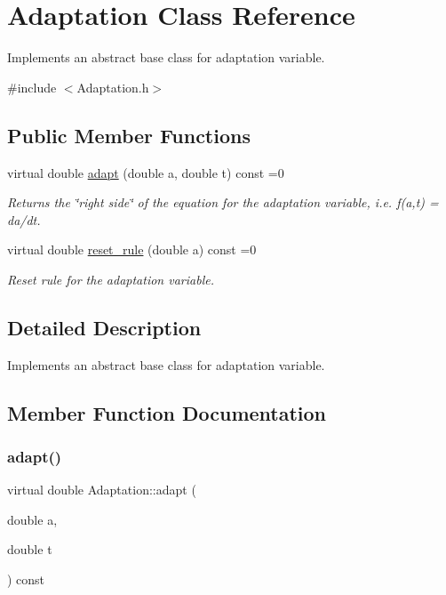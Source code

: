 \hypertarget{classAdaptation}{}\section{Adaptation Class Reference}
\label{classAdaptation}


Implements an abstract base class for adaptation variable.  




{\ttfamily \#include $<$Adaptation.\+h$>$}

\subsection*{Public Member Functions}
\begin{DoxyCompactItemize}
\item 
virtual double \hyperlink{classAdaptation_a4c7f62690bb8639a307c0ed840890e30}{adapt} (double a, double t) const =0
\begin{DoxyCompactList}\small\item\em Returns the \char`\"{}right side\char`\"{} of the equation for the adaptation variable, i.\+e. f(a,t) = da/dt. \end{DoxyCompactList}\item 
virtual double \hyperlink{classAdaptation_a146da63f54c22a3c08c2c5ce26f11f66}{reset\+\_\+rule} (double a) const =0
\begin{DoxyCompactList}\small\item\em Reset rule for the adaptation variable. \end{DoxyCompactList}\end{DoxyCompactItemize}


\subsection{Detailed Description}
Implements an abstract base class for adaptation variable. 

\subsection{Member Function Documentation}
\mbox{\label{classAdaptation_a4c7f62690bb8639a307c0ed840890e30}} 
\subsubsection{\texorpdfstring{adapt()}{adapt()}}
{\footnotesize\ttfamily virtual double Adaptation\+::adapt (\begin{DoxyParamCaption}\item[{double}]{a,  }\item[{double}]{t }\end{DoxyParamCaption}) const\hspace{0.3cm}{\ttfamily [pure virtual]}}



